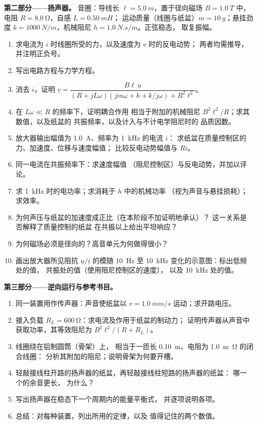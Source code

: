 \begin{problem}
\medskip
\noindent\textbf{第二部分——扬声器。}
音圈：导线长 $\ell = \qty{5.0}{m}$，置于径向磁场 $B =
\qty{1.0}{T}$ 中，电阻 $R = \qty{8.0}{\ohm}$，自感 $L = \qty{0.50}{mH}$；
运动质量（线圈与纸盆）$m = \qty{10}{g}$；悬挂劲度
$k = \qty{1000}{N/m}$，机械阻尼 $h = \qty{1.0}{N.s/m}$。正弦稳态，
取复振幅。
\begin{enumerate}[resume]
  \item 求电流为 $i$ 时线圈所受的力，以及速度为 $v$ 时的反电动势；
        两者均需推导，并注明正负号。
  \item 写出电路方程与力学方程。
  \item 消去 $i$，证明
        $\underline v = \dfrac{B\ell\,\underline u}{(R + jL\omega)(jm\omega + h + k/j\omega) + B^2\ell^2}$。
  \item 在 $L\omega \ll R$ 的频率下，证明耦合作用
        相当于附加的机械阻尼 $B^2\ell^2/R$；求其数值，以及纸盆的
        共振频率，以及计入与不计电学阻尼时的
        品质因数。
  \item 放大器输出幅值为 \qty{1.0}{A}、频率为 \qty{1}{kHz} 的电流 $i$：
        求纸盆在质量控制区的力、加速度、位移与速度幅值；
        比较反电动势幅值与
        $Ri$。
  \item 同一电流在共振频率下：求速度幅值
        （阻尼控制区）与反电动势，并加以评论。
  \item 求 \qty{1}{kHz} 时的电功率；求消耗于 $h$ 中的机械功率
        （视为声音与悬挂损耗）；求效率。
  \item 为何声压与纸盆的加速度成正比（在本阶段不加证明地承认）？
        这一关系是否解释了质量控制的纸盆
        在共振以上给出平坦响应？
  \item 为何磁场必须是径向的？高音单元为何做得很小？
  \item 画出放大器所见阻抗 $\underline u/\underline i$ 的模随
        \qty{10}{Hz} 至 \qty{10}{kHz} 变化的示意图：标出低频处的值，
        共振处的值（使用阻尼控制区的速度），
        以及 \qty{10}{kHz} 处的值。
\end{enumerate}

\medskip
\noindent\textbf{第三部分——逆向运行与参考书目。}
\begin{enumerate}[resume]
  \item 同一装置用作传声器：声音使纸盆以
        $v = \qty{1.0}{mm/s}$ 运动；求开路电压。
  \item 接入负载 $R_L = \qty{600}{\ohm}$：求电流及作用于纸盆的制动力；
        证明传声器从声音中获取功率，其等效阻尼为
        $B^2\ell^2/(R + R_L)$。
  \item 线圈绕在铝制圆筒（骨架）上，
        相当于一匝长 \qty{0.10}{m}、电阻为 \qty{1.0}{m\ohm} 的闭合线圈：
        分析其附加的阻尼；说明骨架为何要开槽。
  \item 轻敲接线柱开路的扬声器的纸盆，再轻敲接线柱短路的扬声器的纸盆：
        哪一个的余音更长，
        为什么？
  \item 写出扬声器在稳态下一个周期内的能量平衡式，
        并逐项说明各项。
  \item 总结：对每种装置，列出所用的定律，以及
        值得记住的两个数值。
\end{enumerate}
\end{problem}
